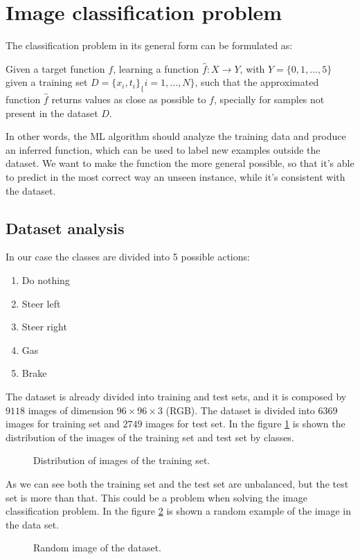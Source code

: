 \section{Image classification problem}
The classification problem in its general form can be formulated as:\\
\begin{definition} Given a target function $f$, learning a function $\hat{f}: X\rightarrow Y$, with $Y = \{0, 1,..., 5\}$ given a training set $D = \{x_i,t_i\}_\{i=1,...,N\}$, such that the approximated function $\hat{f}$ returns values as close as possible to $f$, specially for samples not present in the dataset $D$.
\end{definition}
In other words, the ML algorithm should analyze the training data and produce an inferred function, which can be used to label new examples outside the dataset. We want to make the function the more general possible, so that it’s able to predict in the most correct way an unseen instance, while it’s consistent with the dataset.
\subsection{Dataset analysis}
In our case the classes are divided into 5 possible actions: 
\begin{enumerate}
\item{Do nothing}
\item{Steer left}
\item{Steer right}
\item{Gas}
\item{Brake}
\end{enumerate}
The dataset is already divided into training and test sets, and it is composed by $9118$ images of dimension $96 \times 96 \times 3$ (RGB).
The dataset is divided into $6369$ images for training set and $2749$ images for test set. In the figure \ref{fig:dataset} is shown the distribution of the images of the training set and test set by classes.
\begin{figure}
\begin{minipage}{7cm}
	\trainDue
\end{minipage}
\begin{minipage}{7cm}
	\testDue
\end{minipage}
    	\caption{Distribution of images of the training set.}
   	\label{fig:dataset}
\end{figure}
As we can see both the training set and the test set are unbalanced, but the test set is more than that. This could be a problem when solving the image classification problem. In the figure \ref{fig:photo} is shown a random example of the image in the data set.
\begin{figure}[h!]
    \photo
    \caption{Random image of the dataset.}
    \label{fig:photo}
\end{figure}


